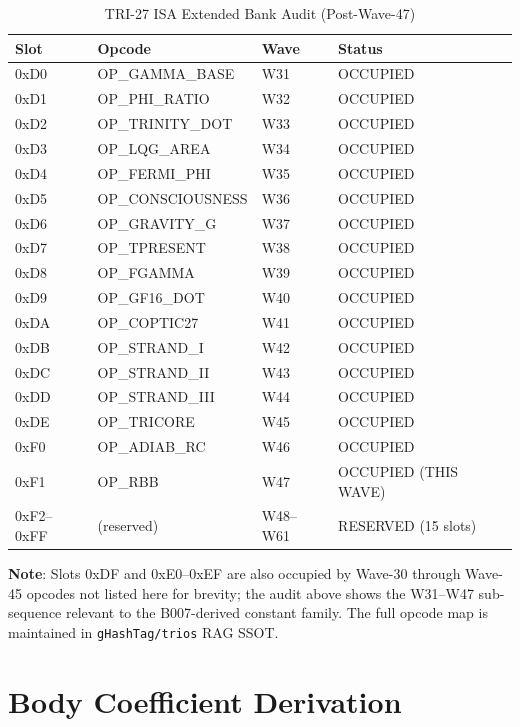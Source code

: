 \begin{table}[h]
\centering
\caption{TRI-27 ISA Extended Bank Audit (Post-Wave-47)}
\label{tab:bank-audit}
\begin{tabular}{llll}
\hline
\textbf{Slot} & \textbf{Opcode} & \textbf{Wave} & \textbf{Status} \\
\hline
0xD0 & OP\_GAMMA\_BASE   & W31 & OCCUPIED \\
0xD1 & OP\_PHI\_RATIO    & W32 & OCCUPIED \\
0xD2 & OP\_TRINITY\_DOT  & W33 & OCCUPIED \\
0xD3 & OP\_LQG\_AREA     & W34 & OCCUPIED \\
0xD4 & OP\_FERMI\_PHI    & W35 & OCCUPIED \\
0xD5 & OP\_CONSCIOUSNESS & W36 & OCCUPIED \\
0xD6 & OP\_GRAVITY\_G    & W37 & OCCUPIED \\
0xD7 & OP\_TPRESENT      & W38 & OCCUPIED \\
0xD8 & OP\_FGAMMA        & W39 & OCCUPIED \\
0xD9 & OP\_GF16\_DOT     & W40 & OCCUPIED \\
0xDA & OP\_COPTIC27      & W41 & OCCUPIED \\
0xDB & OP\_STRAND\_I     & W42 & OCCUPIED \\
0xDC & OP\_STRAND\_II    & W43 & OCCUPIED \\
0xDD & OP\_STRAND\_III   & W44 & OCCUPIED \\
0xDE & OP\_TRICORE       & W45 & OCCUPIED \\
0xF0 & OP\_ADIAB\_RC     & W46 & OCCUPIED \\
0xF1 & OP\_RBB           & W47 & OCCUPIED (THIS WAVE) \\
0xF2--0xFF & (reserved)  & W48--W61 & RESERVED (15 slots) \\
\hline
\end{tabular}
\end{table}

\noindent\textbf{Note}: Slots 0xDF and 0xE0--0xEF are also occupied by
Wave-30 through Wave-45 opcodes not listed here for brevity; the audit above
shows the W31--W47 sub-sequence relevant to the B007-derived constant family.
The full opcode map is maintained in \texttt{gHashTag/trios} RAG SSOT.

\section{Body Coefficient Derivation}
\label{app:body-coeff-derivation}

